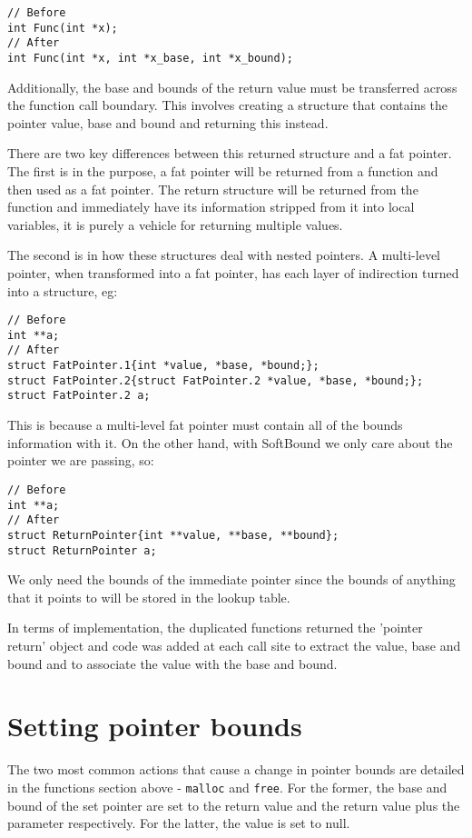 \begin{verbatim}
// Before
int Func(int *x);
// After
int Func(int *x, int *x_base, int *x_bound);
\end{verbatim}

Additionally, the base and bounds of the return value must be transferred across the function call boundary.
This involves creating a structure that contains the pointer value, base and bound and returning this instead.

There are two key differences between this returned structure and a fat pointer.
The first is in the purpose, a fat pointer will be returned from a function and then used as a fat pointer.
The return structure will be returned from the function and immediately have its information stripped from it into local variables, it is purely a vehicle for returning multiple values.

The second is in how these structures deal with nested pointers.
A multi-level pointer, when transformed into a fat pointer, has each layer of indirection turned into a structure, eg:

\begin{verbatim}
// Before
int **a;
// After
struct FatPointer.1{int *value, *base, *bound;};
struct FatPointer.2{struct FatPointer.2 *value, *base, *bound;};
struct FatPointer.2 a;
\end{verbatim}

This is because a multi-level fat pointer must contain all of the bounds information with it.
On the other hand, with SoftBound we only care about the pointer we are passing, so:

\begin{verbatim}
// Before
int **a;
// After
struct ReturnPointer{int **value, **base, **bound};
struct ReturnPointer a;
\end{verbatim}

We only need the bounds of the immediate pointer since the bounds of anything that it points to will be stored in the lookup table.

In terms of implementation, the duplicated functions returned the 'pointer return' object and code was added at each call site to extract the value, base and bound and to associate the value with the base and bound.

\section{Setting pointer bounds}

The two most common actions that cause a change in pointer bounds are detailed in the functions section above - \verb!malloc! and \verb!free!.
For the former, the base and bound of the set pointer are set to the return value and the return value plus the parameter respectively.
For the latter, the value is set to null.

